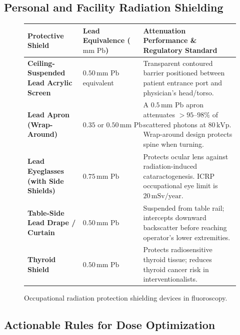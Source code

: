 \documentclass[11pt,a4paper]{article}
\begin{document}
\subsection{Personal and Facility Radiation Shielding}

\begin{figure}[htbp]
\centering
\setlength{\tabcolsep}{4pt}
\begin{tabular}{p{3.8cm}p{5.5cm}p{5.5cm}}
\toprule
\textbf{Protective Shield} & \textbf{Lead Equivalence ($\text{mm Pb}$)} & \textbf{Attenuation Performance \& Regulatory Standard} \\
\midrule
\textbf{Ceiling-Suspended Lead Acrylic Screen} & $0.50\,\text{mm Pb}$ equivalent & Transparent contoured barrier positioned between patient entrance port and physician's head/torso. \\
\addlinespace
\textbf{Lead Apron (Wrap-Around)} & $0.35\text{ or }0.50\,\text{mm Pb}$ & A $0.5\,\text{mm Pb}$ apron attenuates $> 95\text{--}98\%$ of scattered photons at $80\,\text{kVp}$. Wrap-around design protects spine when turning. \\
\addlinespace
\textbf{Lead Eyeglasses (with Side Shields)} & $0.75\,\text{mm Pb}$ & Protects ocular lens against radiation-induced cataractogenesis. ICRP occupational eye limit is $20\,\text{mSv/year}$. \\
\addlinespace
\textbf{Table-Side Lead Drape / Curtain} & $0.50\,\text{mm Pb}$ & Suspended from table rail; intercepts downward backscatter before reaching operator's lower extremities. \\
\addlinespace
\textbf{Thyroid Shield} & $0.50\,\text{mm Pb}$ & Protects radiosensitive thyroid tissue; reduces thyroid cancer risk in interventionalists. \\
\bottomrule
\end{tabular}
\caption{Occupational radiation protection shielding devices in fluoroscopy.}
\label{tab:lead_shielding}
\end{figure}

\subsection{Actionable Rules for Dose Optimization}
\end{document}
